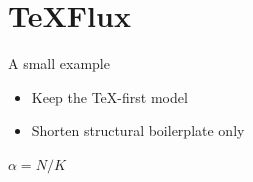 \section{TeXFlux}

\begin{frame}{A small example}
\vspace{-.5em}
\begin{itemize}
\item Keep the TeX-first model
\item<2->[A] Shorten structural boilerplate only
\end{itemize}
\medskip
$\alpha = N/K$
\end{frame}
